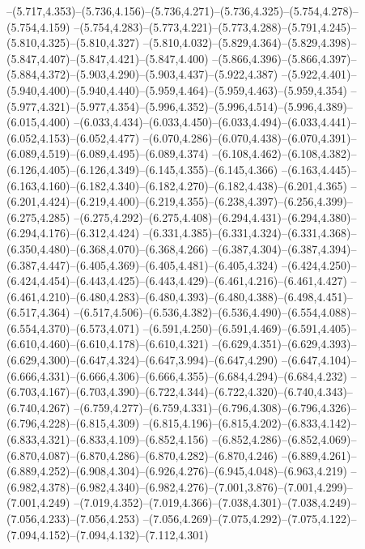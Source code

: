   --(5.717,4.353)--(5.736,4.156)--(5.736,4.271)--(5.736,4.325)--(5.754,4.278)--(5.754,4.159)%
  --(5.754,4.283)--(5.773,4.221)--(5.773,4.288)--(5.791,4.245)--(5.810,4.325)--(5.810,4.327)%
  --(5.810,4.032)--(5.829,4.364)--(5.829,4.398)--(5.847,4.407)--(5.847,4.421)--(5.847,4.400)%
  --(5.866,4.396)--(5.866,4.397)--(5.884,4.372)--(5.903,4.290)--(5.903,4.437)--(5.922,4.387)%
  --(5.922,4.401)--(5.940,4.400)--(5.940,4.440)--(5.959,4.464)--(5.959,4.463)--(5.959,4.354)%
  --(5.977,4.321)--(5.977,4.354)--(5.996,4.352)--(5.996,4.514)--(5.996,4.389)--(6.015,4.400)%
  --(6.033,4.434)--(6.033,4.450)--(6.033,4.494)--(6.033,4.441)--(6.052,4.153)--(6.052,4.477)%
  --(6.070,4.286)--(6.070,4.438)--(6.070,4.391)--(6.089,4.519)--(6.089,4.495)--(6.089,4.374)%
  --(6.108,4.462)--(6.108,4.382)--(6.126,4.405)--(6.126,4.349)--(6.145,4.355)--(6.145,4.366)%
  --(6.163,4.445)--(6.163,4.160)--(6.182,4.340)--(6.182,4.270)--(6.182,4.438)--(6.201,4.365)%
  --(6.201,4.424)--(6.219,4.400)--(6.219,4.355)--(6.238,4.397)--(6.256,4.399)--(6.275,4.285)%
  --(6.275,4.292)--(6.275,4.408)--(6.294,4.431)--(6.294,4.380)--(6.294,4.176)--(6.312,4.424)%
  --(6.331,4.385)--(6.331,4.324)--(6.331,4.368)--(6.350,4.480)--(6.368,4.070)--(6.368,4.266)%
  --(6.387,4.304)--(6.387,4.394)--(6.387,4.447)--(6.405,4.369)--(6.405,4.481)--(6.405,4.324)%
  --(6.424,4.250)--(6.424,4.454)--(6.443,4.425)--(6.443,4.429)--(6.461,4.216)--(6.461,4.427)%
  --(6.461,4.210)--(6.480,4.283)--(6.480,4.393)--(6.480,4.388)--(6.498,4.451)--(6.517,4.364)%
  --(6.517,4.506)--(6.536,4.382)--(6.536,4.490)--(6.554,4.088)--(6.554,4.370)--(6.573,4.071)%
  --(6.591,4.250)--(6.591,4.469)--(6.591,4.405)--(6.610,4.460)--(6.610,4.178)--(6.610,4.321)%
  --(6.629,4.351)--(6.629,4.393)--(6.629,4.300)--(6.647,4.324)--(6.647,3.994)--(6.647,4.290)%
  --(6.647,4.104)--(6.666,4.331)--(6.666,4.306)--(6.666,4.355)--(6.684,4.294)--(6.684,4.232)%
  --(6.703,4.167)--(6.703,4.390)--(6.722,4.344)--(6.722,4.320)--(6.740,4.343)--(6.740,4.267)%
  --(6.759,4.277)--(6.759,4.331)--(6.796,4.308)--(6.796,4.326)--(6.796,4.228)--(6.815,4.309)%
  --(6.815,4.196)--(6.815,4.202)--(6.833,4.142)--(6.833,4.321)--(6.833,4.109)--(6.852,4.156)%
  --(6.852,4.286)--(6.852,4.069)--(6.870,4.087)--(6.870,4.286)--(6.870,4.282)--(6.870,4.246)%
  --(6.889,4.261)--(6.889,4.252)--(6.908,4.304)--(6.926,4.276)--(6.945,4.048)--(6.963,4.219)%
  --(6.982,4.378)--(6.982,4.340)--(6.982,4.276)--(7.001,3.876)--(7.001,4.299)--(7.001,4.249)%
  --(7.019,4.352)--(7.019,4.366)--(7.038,4.301)--(7.038,4.249)--(7.056,4.233)--(7.056,4.253)%
  --(7.056,4.269)--(7.075,4.292)--(7.075,4.122)--(7.094,4.152)--(7.094,4.132)--(7.112,4.301)%
